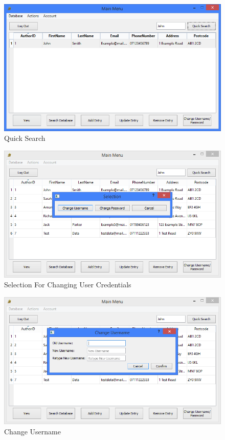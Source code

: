 \begin{figure}[H]
    \caption{Quick Search} \label{fig:QuickSearch}
    \includegraphics[width=\textwidth]{./Maintenance/UserInterface/QuickSearch.png}
\end{figure}

\begin{figure}[H]
    \caption{Selection For Changing User Credentials} \label{fig:ChangeSelection}
    \includegraphics[width=\textwidth]{./Maintenance/UserInterface/ChangeSelection.png}
\end{figure}

\begin{figure}[H]
    \caption{Change Username} \label{fig:ChangeUsername}
    \includegraphics[width=\textwidth]{./Maintenance/UserInterface/ChangeUsername.png}
\end{figure}

